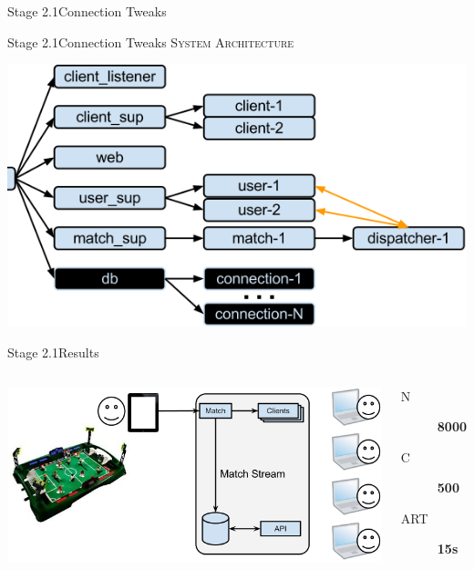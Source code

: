 \documentclass[utf8]{beamer}
\begin{document}
\begin{frame}{Stage 2.1}{Connection Tweaks}
\end{frame}
\begin{frame}{Stage 2.1}{Connection Tweaks}
	\textsc{System Architecture}
	\begin{center}
		\includegraphics[height=.7\textheight]{img/architecture-2.png}
	\end{center}
\end{frame}
\begin{frame}{Stage 2.1}{Results}
	\begin{columns}
			\includegraphics[top=-1,width=\textwidth]{img/results-3-1.png}
			\begin{description}
				\item[N] \textbf{\Large 8000}
				\item[C] \textbf{\Large 500}
				\item[ART] \textbf{\Large 15s}
			\end{description}
	\end{columns}
\end{frame}
\end{document}

